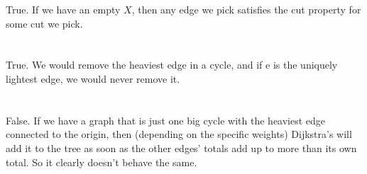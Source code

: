 \documentclass[a4paper]{article}
\begin{document}
True. If we have an empty $X$, then any edge we pick satisfies the cut property for some cut we pick.

\section{}

True. We would remove the heaviest edge in a cycle, and if e is the uniquely lightest edge, we would never remove it.

\section{}

False. If we have a graph that is just one big cycle with the heaviest edge connected to the origin, then (depending on the specific weights) Dijkstra's will add it to the tree as soon as the other edges' totals add up to more than its own total. So it clearly doesn't behave the same.
\end{document}
